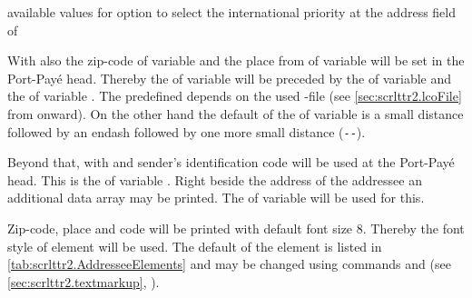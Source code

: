 \begin{table}
  \caption[{available values for option  in
    }]{available values for option  to select
    the international priority at the address field of}
  \label{tab:scrlttr2.priority}
  \begin{desctabular}
  \end{desctabular}
\end{table}

With
 also the zip-code of
variable  and the place from  of variable
 will be set in the Port-Pay\'e head. Thereby the
 of variable  will be preceded by the
 of variable  and the 
of variable . The predefined 
depends on the used -file (see \autoref{sec:scrlttr2.lcoFile} from
 onward). On the other hand the default of
the  of variable  is a small
distance followed by an endash followed by one more small distance
(\Macro{,}\texttt{-{}-}\Macro{,}).

Beyond that, with
 and
sender's identification code will be used at the Port-Pay\'e head. This is the
 of variable . Right beside the address of the
addressee an additional data array may be printed. The  of
variable  will be used for this.

%
Zip-code, place and code will be printed
with default font size 8. Thereby the font style of element
 will be used. The default
of the element is listed in \autoref{tab:scrlttr2.AddresseeElements} and may
be changed using commands  and  (see
\autoref{sec:scrlttr2.textmarkup},
).%
%
%
%
%
%
%

